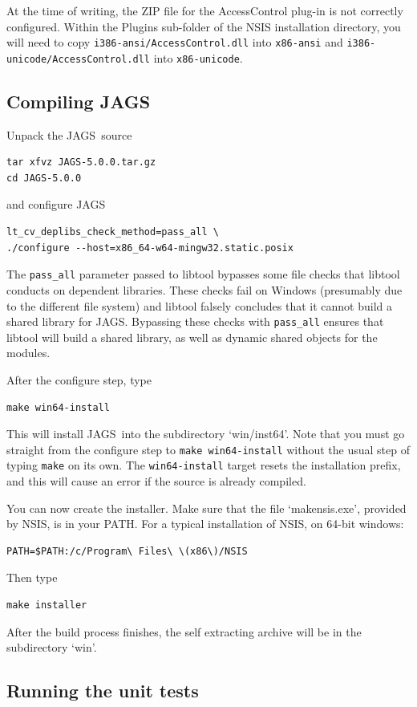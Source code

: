 \documentclass[11pt, a4paper, titlepage]{article}
\newcommand{\JAGS}{\textsf{JAGS}}
\newcommand{\file}[1]{{`\normalfont\textsf{#1}'}}
\begin{document}
At the time of writing, the ZIP file for the AccessControl plug-in is
not correctly configured. Within the Plugins sub-folder of the NSIS
installation directory, you will need to copy
\texttt{i386-ansi/AccessControl.dll} into \texttt{x86-ansi} and
\texttt{i386-unicode/AccessControl.dll} into \texttt{x86-unicode}.

\subsection{Compiling \JAGS}

Unpack the \JAGS\ source
\begin{verbatim}
tar xfvz JAGS-5.0.0.tar.gz
cd JAGS-5.0.0
\end{verbatim}
and configure \JAGS 
\begin{verbatim}
lt_cv_deplibs_check_method=pass_all \
./configure --host=x86_64-w64-mingw32.static.posix 
\end{verbatim}
The \verb+pass_all+ parameter passed to libtool bypasses some file
checks that libtool conducts on dependent libraries. These checks fail
on Windows (presumably due to the different file system) and libtool
falsely concludes that it cannot build a shared library for
JAGS. Bypassing these checks with \verb+pass_all+ ensures that libtool
will build a shared library, as well as dynamic shared objects for the
modules.

After the configure step, type
\begin{verbatim}
make win64-install
\end{verbatim}
This will install \JAGS\ into the subdirectory \file{win/inst64}.  Note
that you must go straight from the configure step to \texttt{make
  win64-install} without the usual step of typing \texttt{make} on its
own.  The \texttt{win64-install} target resets the installation
prefix, and this will cause an error if the source is already
compiled.

You can now create the installer. Make sure that the file
\file{makensis.exe}, provided by NSIS, is in your PATH. For a typical
installation of NSIS, on 64-bit windows:
\begin{verbatim}
PATH=$PATH:/c/Program\ Files\ \(x86\)/NSIS
\end{verbatim}
Then type
\begin{verbatim}
make installer
\end{verbatim}
After the build process finishes, the self extracting archive will be
in the subdirectory \file{win}.

\subsection{Running the unit tests}
\end{document}
